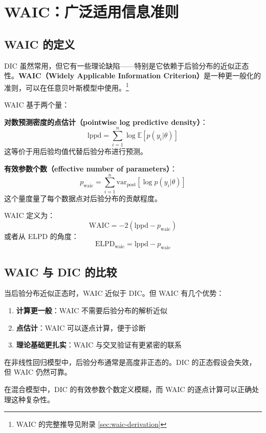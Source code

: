 \section{WAIC：广泛适用信息准则}

\subsection{WAIC 的定义}

DIC 虽然常用，但它有一些理论缺陷——特别是它依赖于后验分布的近似正态性。\textbf{WAIC（Widely Applicable Information Criterion）}是一种更一般化的准则，可以在任意贝叶斯模型中使用。\footnote{WAIC 的完整推导见附录 \cref{sec:waic-derivation}}

WAIC 基于两个量：

\textbf{对数预测密度的点估计（pointwise log predictive density）}：
\[
\text{lppd} = \sum_{i=1}^n \log \mathbb{E}[p(y_i | \theta)]
\]
这等价于用后验均值代替后验分布进行预测。

\textbf{有效参数个数（effective number of parameters）}：
\[
p_{\text{waic}} = \sum_{i=1}^n \text{var}_{\text{post}}[\log p(y_i | \theta)]
\]
这个量度量了每个数据点对后验分布的贡献程度。

WAIC 定义为：
\[
\text{WAIC} = -2 (\text{lppd} - p_{\text{waic}})
\]
或者从 ELPD 的角度：
\[
\text{ELPD}_{\text{waic}} = \text{lppd} - p_{\text{waic}}
\]

\subsection{WAIC 与 DIC 的比较}

当后验分布近似正态时，WAIC 近似于 DIC。但 WAIC 有几个优势：

\begin{enumerate}
  \item \textbf{计算更一般}：WAIC 不需要后验分布的解析近似
  \item \textbf{点估计}：WAIC 可以逐点计算，便于诊断
  \item \textbf{理论基础更扎实}：WAIC 与交叉验证有更紧密的联系
\end{enumerate}

\begin{Example}
  在非线性回归模型中，后验分布通常是高度非正态的。DIC 的正态假设会失效，但 WAIC 仍然可靠。

  在混合模型中，DIC 的有效参数个数定义模糊，而 WAIC 的逐点计算可以正确处理这种复杂性。
\end{Example}

